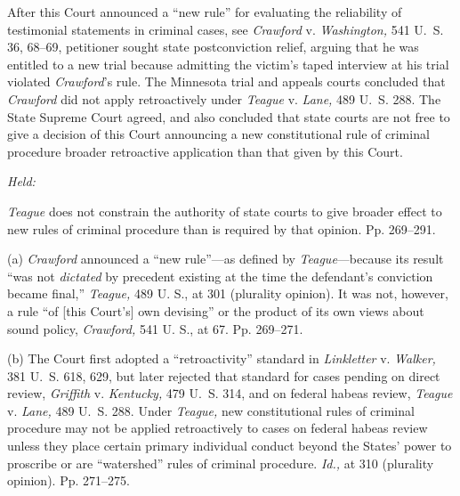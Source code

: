 
\setcounter{page}{264}

  After this Court announced a ``new rule'' for evaluating the reliability of testimonial statements in criminal cases, see \emph{Crawford} v. \emph{Washington,} 541 U.~S. 36, 68--69, petitioner sought state postconviction relief, arguing that he was entitled to a new trial because admitting the victim's taped interview at his trial violated \emph{Crawford}'s rule. The Minnesota trial and appeals courts concluded that \emph{Crawford} did not apply retroactively under \emph{Teague} v. \emph{Lane,} 489 U.~S. 288. The State Supreme Court agreed, and also concluded that state courts are not free to give a decision of this Court announcing a new constitutional rule of criminal procedure broader retroactive application than that given by this Court.

\emph{Held:}

\emph{Teague} does not constrain the authority of state courts to give broader effect to new rules of criminal procedure than is required by that opinion. Pp. 269--291.

  (a) \emph{Crawford} announced a ``new rule''---as defined by \emph{Teague}---because its result ``was not \emph{dictated} by precedent existing at the time the defendant's conviction became final,'' \emph{Teague,} 489 U. S., at 301 (plurality opinion). It was not, however, a rule ``of [this Court's] own devising'' or the product of its own views about sound policy, \emph{Crawford,} 541 U. S., at 67. Pp. 269--271.

  (b) The Court first adopted a ``retroactivity'' standard in \emph{Linkletter} v. \emph{Walker,} 381 U.~S. 618, 629, but later rejected that standard for cases pending on direct review, \emph{Griffith} v. \emph{Kentucky,} 479 U.~S. 314, and on federal habeas review, \emph{Teague} v. \emph{Lane,} 489 U.~S. 288. Under \emph{Teague,} new constitutional rules of criminal procedure may not be applied retroactively to cases on federal habeas review unless they place certain primary individual conduct beyond the States' power to proscribe or are ``watershed'' rules of criminal procedure. \emph{Id.,} at 310 (plurality opinion). Pp. 271--275.

